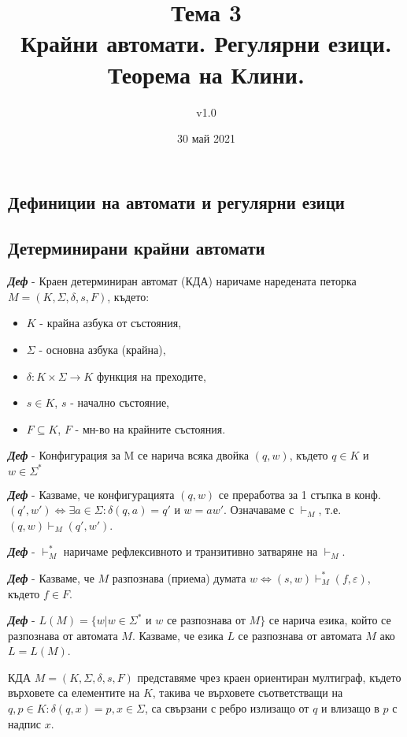 \documentclass[fleqn,12pt]{article}
\title{Тема 3\\ Крайни автомати. Регулярни езици. Теорема на Клини.}
\author{v1.0}
\date{30 май 2021}
\begin{document}
\maketitle

\tableofcontents
\pagebreak
\begin{flushleft}

\section{Дефиниции на автомати и регулярни езици}
\subsection{Детерминирани крайни автомати}

\textit{\textbf{Деф}} - Краен детерминиран автомат (КДА) наричаме наредената петорка $M = (K, \Sigma, \delta, s, F)$, където:
\begin{itemize}
    \item $K$ - крайна азбука от състояния,
    \item $\Sigma$ - основна азбука (крайна),
    \item $\delta : K \times \Sigma \rightarrow K$ функция на преходите,
    \item $s \in K$, $s$ - начално състояние,
    \item $F \subseteq K$, $F$ - мн-во на крайните състояния.
\end{itemize}

\textit{\textbf{Деф}} - Конфигурация за M се нарича всяка двойка $(q, w)$, където $q \in K$ и $w \in \Sigma^*$

\textit{\textbf{Деф}} - Казваме, че конфигурацията $(q, w)$ се преработва за 1 стъпка в конф. $(q', w') \iff \exists a \in \Sigma : \delta(q, a) = q'$ и $w = aw'$. Означаваме с $\vdash_M$, т.е. $(q, w) \vdash_M (q', w')$.

\textit{\textbf{Деф}} - $\vdash_M^*$ наричаме рефлексивното и транзитивно затваряне на $\vdash_M$.

\textit{\textbf{Деф}} - Казваме, че $M$ разпознава (приема) думата $w \iff (s, w) \vdash_M^* (f, \varepsilon)$, където $f \in F$.

\textit{\textbf{Деф}} - $L(M) = \{w | w \in \Sigma^*$ и $w$ се разпознава от $M\}$ се нарича езика, който се разпознава от автомата $M$. Казваме, че езика $L$ се разпознава от автомата $M$ ако $L = L(M)$.

КДА $M = (K, \Sigma, \delta, s, F)$ представяме чрез краен ориентиран мултиграф, където върховете са елементите на $K$, такива че върховете съответстващи на $q, p \in K: \delta(q, x) = p, x \in \Sigma$, са свързани с ребро излизащо от $q$ и влизащо в $p$ с надпис $x$.


\end{flushleft}
\end{document}
